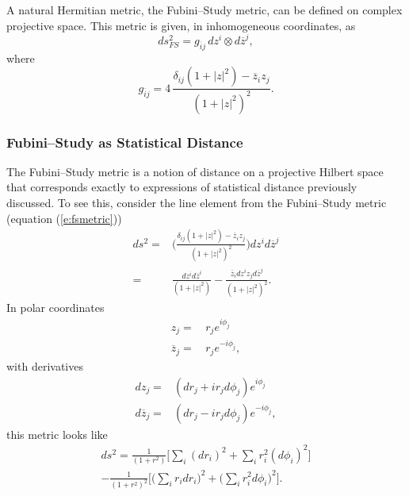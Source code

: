 %
A natural Hermitian metric, the Fubini--Study metric\cite{Fubini:03,Study:05},
can be defined on complex projective space.
This metric is given, in inhomogeneous coordinates, as
\begin{equation}
ds_{FS}^2 = g_{\overline{i}j}\, dz^i\otimes d\overline{z}^j,
\end{equation}
where 
\begin{equation}
g_{\overline{i}j} = 4\,\frac{\delta_{ij}\left( 1 + \left| z \right|^2 \right) - 
                                                    \overline{z}_i z_j }
{ \left( 1 + \left| z\right|^2 \right)^2 }.
\label{e:fsmetric}
\end{equation}


\subsubsection{Fubini--Study as Statistical Distance}

The Fubini--Study metric is a notion of distance on a projective
Hilbert space that corresponds exactly to expressions of statistical
distance previously discussed.  To see this, consider the 
line element from the Fubini--Study
metric 
(equation (\ref{e:fsmetric})) 
\begin{equation}
\begin{split}
ds^2 =& \biggl(
            \frac{\delta_{ij}\left( 1 + |z|^2 \right) - \overline{z}_iz_j}
                 { \left( 1 + |z|^2 \right)^2 }
       \biggr)
       dz^id\overline{z}^j\\
=& \frac{ dz^id\overline{z}^i }{ \left( 1 + |z|^2 \right) }
- \frac{ \overline{z}_idz^iz_jd\overline{z}^j }
                 { \left( 1 + |z|^2 \right)^2 }.
\end{split}
\end{equation}
In polar coordinates
\begin{equation}
\begin{split}
z_j=&\,r_je^{i\phi_j}\\
\overline{z}_j=&\,r_je^{-i\phi_j},
\end{split}
\end{equation}
with derivatives
\begin{equation}
\begin{split}
dz_j =& \left( dr_j + ir_jd\phi_j \right) e^{i\phi_j}\\
d\overline{z}_j =& \left( dr_j - ir_jd\phi_j \right) e^{-i\phi_j},
\end{split}
\end{equation}
this metric looks like
\begin{multline}
ds^2 = \frac{1}{\left( 1+r^2 \right)}
    \biggl[\sum_i\left(dr_i\right)^2 + \sum_i r_i^2\left(d\phi_i\right)^2\biggr]\\
- \frac{1}{\left( 1+r^2 \right)^2}
    \biggl[\biggl(\sum_i r_idr_i\biggr)^2
           + \biggl(\sum_i r_i^2d\phi_i\biggr)^2
    \biggr].
\label{e:fsPolar}
\end{multline}

